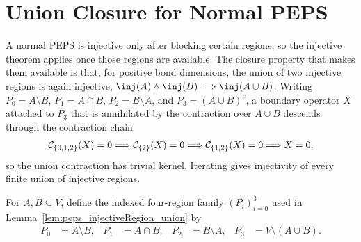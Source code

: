 \section{Union Closure for Normal PEPS}\label{sec:peps_normal_union}

A normal PEPS is injective only after blocking certain regions, so the injective
theorem applies once those regions are available. The closure property that
makes them available is that, for positive bond dimensions, the union of two
injective regions is again injective,
$\inj(A)\wedge\inj(B)\Longrightarrow\inj(A\cup B)$.
Writing $P_0=A\setminus B$, $P_1=A\cap B$, $P_2=B\setminus A$, and
$P_3=(A\cup B)^c$, a boundary operator $X$ attached to $P_3$ that is annihilated
by the contraction over $A\cup B$ descends through the contraction chain
\begin{align}
    \mathcal C_{\{0,1,2\}}(X)=0
    \Longrightarrow \mathcal C_{\{2\}}(X)=0
    \Longrightarrow \mathcal C_{\{1,2\}}(X)=0
    \Longrightarrow X=0,
    \notag
\end{align}
so the union contraction has trivial kernel. Iterating gives injectivity of
every finite union of injective regions.

\begin{definition}%
    \label{def:peps_regionUnionDecomposition}
    \leanok
    For $A,B\subseteq V$, define the indexed four-region family
    $(P_i)_{i=0}^3$ used in Lemma~\ref{lem:peps_injectiveRegion_union} by
    \begin{align}
        P_0 & = A\setminus B,        &
        P_1 & = A\cap B,             &
        P_2 & = B\setminus A,        &
        P_3 & = V\setminus(A\cup B).
        \label{eq:peps_four_region_parts}
    \end{align}
\end{definition}

